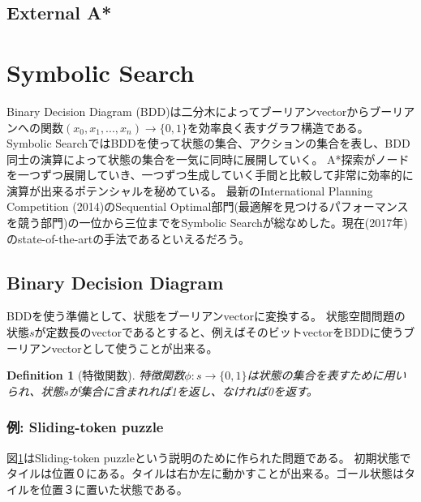 \documentclass{report}
\newtheorem{definition}{Definition}
\begin{document}
\subsection{External A*}


\section{Symbolic Search}

Binary Decision Diagram (BDD)は二分木によってブーリアンvectorからブーリアンへの関数$(x_0,x_1,...,x_n) \rightarrow \{0, 1\}$を効率良く表すグラフ構造である。
Symbolic SearchではBDDを使って状態の集合、アクションの集合を表し、BDD同士の演算によって状態の集合を一気に同時に展開していく。
A*探索がノードを一つずつ展開していき、一つずつ生成していく手間と比較して非常に効率的に演算が出来るポテンシャルを秘めている。
最新のInternational Planning Competition (2014)のSequential Optimal部門(最適解を見つけるパフォーマンスを競う部門)の一位から三位までをSymbolic Searchが総なめした。現在(2017年)のstate-of-the-artの手法であるといえるだろう。

\subsection{Binary Decision Diagram}

BDDを使う準備として、状態をブーリアンvectorに変換する。
状態空間問題の状態$s$が定数長のvectorであるとすると、例えばそのビットvectorをBDDに使うブーリアンvectorとして使うことが出来る。

\begin{definition}[特徴関数]
特徴関数$\phi: s \rightarrow \{0, 1\}$は状態の集合を表すために用いられ、状態$s$が集合に含まれれば1を返し、なければ0を返す。
\end{definition}


\subsubsection{例: Sliding-token puzzle}

図\ref{fig:sliding-token}はSliding-token puzzleという説明のために作られた問題である。
初期状態でタイルは位置０にある。タイルは右か左に動かすことが出来る。ゴール状態はタイルを位置３に置いた状態である。

\begin{figure}
\label{fig:sliding-token}
\end{figure}
\end{document}
